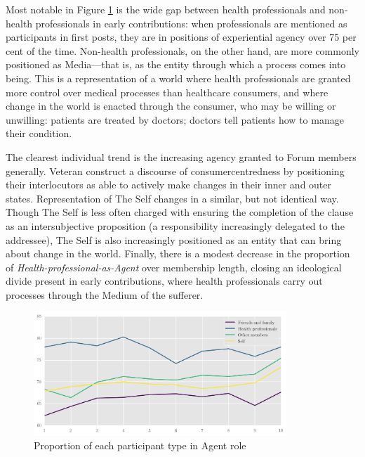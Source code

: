Most notable in Figure \ref{fig:key_proc_for_parts} is the wide gap between health professionals and non\hyp{}health professionals in early contributions: when professionals are mentioned as participants in first \glspl{post}, they are in positions of experiential agency over 75 per cent of the time. Non\hyp{}health professionals, on the other hand, are more commonly positioned as Media---that is, as the entity through which a process comes into being. This is a representation of a world where health professionals are granted more control over medical processes than healthcare \glspl{consumer}, and where change in the world is enacted through the consumer, who may be willing or unwilling: patients are treated by doctors; doctors tell patients how to manage their condition. 

The clearest individual trend is the increasing agency granted to \gls{Forum} \glspl{member} generally. Veteran  construct a discourse of \gls{consumercentred}ness by positioning their interlocutors as able to actively make changes in their inner and outer states. Representation of The Self changes in a similar, but not identical way. Though The Self is less often charged with ensuring the completion of the clause as an intersubjective proposition (a responsibility increasingly delegated to the addressee), The Self is also increasingly positioned as an entity that can bring about change in the world. Finally, there is a modest decrease in the proportion of \emph{Health\hyp{}professional\hyp{}as\hyp{}Agent} over membership length, closing an ideological divide present in early contributions, where health professionals carry out processes through the Medium of the sufferer.

\begin{figure}[htb]
    \centering
    \includegraphics[width=0.85\textwidth]{../images/percentage-agent.png}
    \caption{Proportion of each participant type in Agent role}
    \label{fig:key_proc_for_parts}
    \end{figure}

